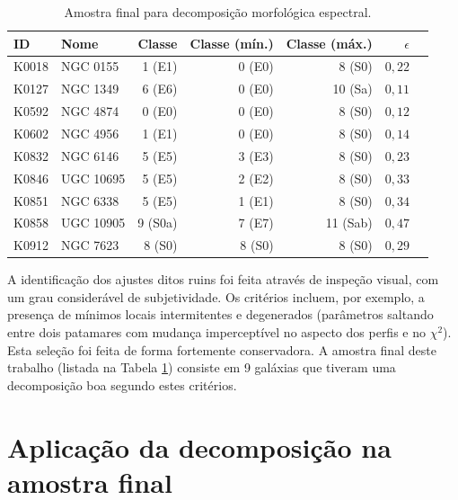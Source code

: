 \begin{table}
\begin{tabular}{ l l r r r r l }
\hline
ID & Nome & Classe & Classe (mín.) & Classe (máx.) & $\epsilon$ \\
\hline
K0018 & NGC 0155  &  1 (E1)  & 0 (E0) &  8 (S0)  & $0,22$ \\
K0127 & NGC 1349  &  6 (E6)  & 0 (E0) & 10 (Sa)  & $0,11$ \\
K0592 & NGC 4874  &  0 (E0)  & 0 (E0) &  8 (S0)  & $0,12$ \\
K0602 & NGC 4956  &  1 (E1)  & 0 (E0) &  8 (S0)  & $0,14$ \\
K0832 & NGC 6146  &  5 (E5)  & 3 (E3) &  8 (S0)  & $0,23$ \\
K0846 & UGC 10695 &  5 (E5)  & 2 (E2) &  8 (S0)  & $0,33$ \\
K0851 & NGC 6338  &  5 (E5)  & 1 (E1) &  8 (S0)  & $0,34$ \\
K0858 & UGC 10905 &  9 (S0a) & 7 (E7) & 11 (Sab) & $0,47$ \\
K0912 & NGC 7623  &  8 (S0)  & 8 (S0) &  8 (S0)  & $0,29$ \\
\hline
\end{tabular}
\caption[Amostra final para decomposição morfológica espectral]
{Amostra final para decomposição morfológica espectral.}
\label{tab:DecompSampleFinal}
\end{table}

A identificação dos ajustes ditos ruins foi feita através de inspeção visual,
com um grau considerável de subjetividade. Os critérios incluem, por exemplo, a
presença de mínimos locais intermitentes e degenerados (parâmetros saltando
entre dois patamares com mudança imperceptível no aspecto dos perfis e no
$\chi^2$). Esta seleção foi feita de forma fortemente conservadora. A amostra
final deste trabalho (listada na Tabela \ref{tab:DecompSampleFinal}) consiste em
9 galáxias que tiveram uma decomposição boa segundo estes critérios.


\section{Aplicação da decomposição na amostra final}
\label{sec:Decomp:decomp}

